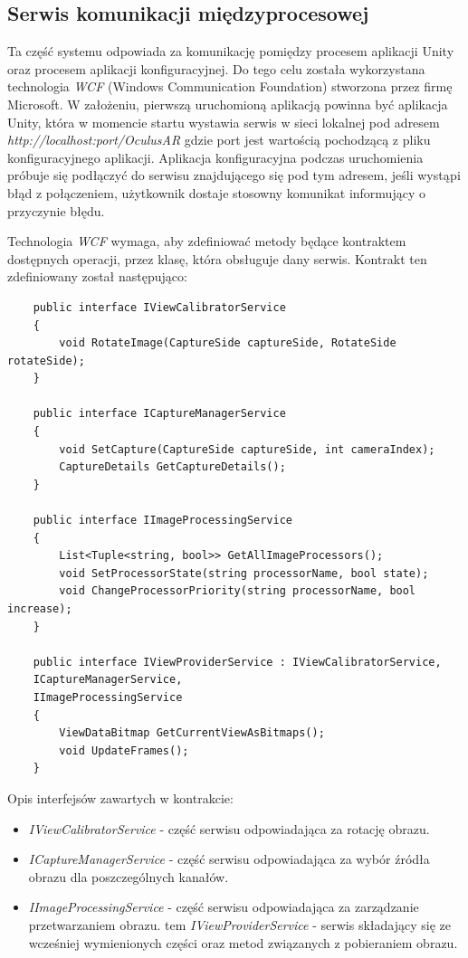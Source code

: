 \documentclass[a4paper,11pt,twoside]{report}
\theoremstyle{definition}
\begin{document}
\subsection {Serwis komunikacji międzyprocesowej}

Ta część systemu odpowiada za komunikację pomiędzy procesem aplikacji Unity oraz procesem aplikacji konfiguracyjnej.  Do tego celu została wykorzystana technologia \textit{WCF}  (Windows Communication Foundation) stworzona przez firmę Microsoft. W założeniu, pierwszą uruchomioną aplikacją powinna być aplikacja Unity, która w momencie startu wystawia serwis w sieci lokalnej pod adresem \textit{http://localhost:{port}/OculusAR} gdzie port jest wartością pochodzącą z pliku konfiguracyjnego aplikacji. Aplikacja konfiguracyjna podczas uruchomienia próbuje się podłączyć do serwisu znajdującego się pod tym adresem, jeśli wystąpi błąd z połączeniem, użytkownik dostaje stosowny komunikat informujący o przyczynie błędu. 

Technologia \textit{WCF} wymaga, aby zdefiniować metody będące kontraktem dostępnych operacji, przez klasę, która obsługuje dany serwis. Kontrakt ten zdefiniowany został następująco:

\lstset{style=sharpc}
\begin{lstlisting}
    public interface IViewCalibratorService
    {
        void RotateImage(CaptureSide captureSide, RotateSide rotateSide);
    }

    public interface ICaptureManagerService
    {
        void SetCapture(CaptureSide captureSide, int cameraIndex);
        CaptureDetails GetCaptureDetails();
    }

    public interface IImageProcessingService
    {
        List<Tuple<string, bool>> GetAllImageProcessors();
        void SetProcessorState(string processorName, bool state);
        void ChangeProcessorPriority(string processorName, bool increase);
    }

    public interface IViewProviderService : IViewCalibratorService, 
	ICaptureManagerService, 
	IImageProcessingService
    {
        ViewDataBitmap GetCurrentViewAsBitmaps();
        void UpdateFrames();
    }
\end{lstlisting}
 
Opis interfejsów zawartych w kontrakcie:
\begin{itemize}
\item \textit{IViewCalibratorService} - część serwisu odpowiadająca za rotację obrazu.
\item \textit{ICaptureManagerService} - część serwisu odpowiadająca za wybór źródła obrazu dla poszczególnych kanałów.
\item \textit{IImageProcessingService} - część serwisu odpowiadająca za zarządzanie przetwarzaniem obrazu.
tem \textit{IViewProviderService} - serwis składający się ze wcześniej wymienionych części oraz metod związanych z pobieraniem obrazu.
\end{itemize}
\end{document}
